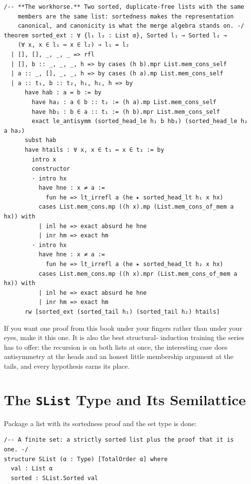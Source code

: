 \documentclass[12pt, a4paper, openright]{book}
\theoremstyle{thmstyle}
\theoremstyle{defstyle}
\begin{document}
\begin{verbatim}
/-- **The workhorse.** Two sorted, duplicate-free lists with the same
    members are the same list: sortedness makes the representation
    canonical, and canonicity is what the merge algebra stands on. -/
theorem sorted_ext : ∀ {l₁ l₂ : List α}, Sorted l₁ → Sorted l₂ →
    (∀ x, x ∈ l₁ ↔ x ∈ l₂) → l₁ = l₂
  | [], [], _, _, _ => rfl
  | [], b :: _, _, _, h => by cases (h b).mpr List.mem_cons_self
  | a :: _, [], _, _, h => by cases (h a).mp List.mem_cons_self
  | a :: t₁, b :: t₂, h₁, h₂, h => by
      have hab : a = b := by
        have ha₂ : a ∈ b :: t₂ := (h a).mp List.mem_cons_self
        have hb₁ : b ∈ a :: t₁ := (h b).mpr List.mem_cons_self
        exact le_antisymm (sorted_head_le h₁ b hb₁) (sorted_head_le h₂ a ha₂)
      subst hab
      have htails : ∀ x, x ∈ t₁ ↔ x ∈ t₂ := by
        intro x
        constructor
        · intro hx
          have hne : x ≠ a :=
            fun he => lt_irrefl a (he ▸ sorted_head_lt h₁ x hx)
          cases List.mem_cons.mp ((h x).mp (List.mem_cons_of_mem a hx)) with
          | inl he => exact absurd he hne
          | inr hm => exact hm
        · intro hx
          have hne : x ≠ a :=
            fun he => lt_irrefl a (he ▸ sorted_head_lt h₂ x hx)
          cases List.mem_cons.mp ((h x).mpr (List.mem_cons_of_mem a hx)) with
          | inl he => exact absurd he hne
          | inr hm => exact hm
      rw [sorted_ext (sorted_tail h₁) (sorted_tail h₂) htails]
\end{verbatim}

If you want one proof from this book under your fingers rather than
under your eyes, make it this one. It is also the best structural-
induction training the series has to offer: the recursion is on both
lists at once, the interesting case does antisymmetry at the heads and
an honest little membership argument at the tails, and every hypothesis
earns its place.

\section{The \texttt{SList} Type and Its Semilattice}

Package a list with its sortedness proof and the set type is done:

\begin{verbatim}
/-- A finite set: a strictly sorted list plus the proof that it is one. -/
structure SList (α : Type) [TotalOrder α] where
  val : List α
  sorted : SList.Sorted val
\end{verbatim}
\end{document}
